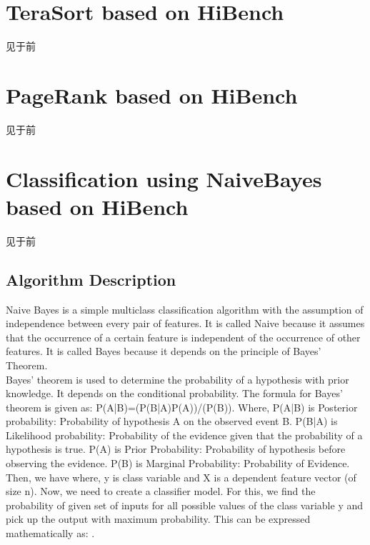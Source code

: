 \begin{titlepage}
\begin{center}
\end{center}
\vspace*{\fill}

\end{titlepage}

\tableofcontents
\pagebreak

\rmfamily
\section{TeraSort based on
HiBench}
见于前



\section{PageRank based on
HiBench}
见于前


\section{Classification using NaiveBayes based on HiBench}
见于前

\iffalse
\subsection{Algorithm Description}
Naive Bayes is a simple multiclass classification algorithm with the assumption of independence between every pair of features. It is called Naive because it assumes that the occurrence of a certain feature is independent of the occurrence of other features. It is called Bayes because it depends on the principle of Bayes' Theorem. \\

Bayes' theorem is used to determine the probability of a hypothesis with prior knowledge. It depends on the conditional probability. The formula for Bayes' theorem is given as: P(A|B)=(P(B|A)P(A))/(P(B)). Where, P(A|B) is Posterior probability: Probability of hypothesis A on the observed event B. P(B|A) is Likelihood probability: Probability of the evidence given that the probability of a hypothesis is true. P(A) is Prior Probability: Probability of hypothesis before observing the evidence. P(B) is Marginal Probability: Probability of Evidence. Then, we have   where, y is class variable and X is a dependent feature vector (of size n). Now, we need to create a classifier model. For this, we find the probability of given set of inputs for all possible values of the class variable y and pick up the output with maximum probability. This can be expressed mathematically as: .\\

